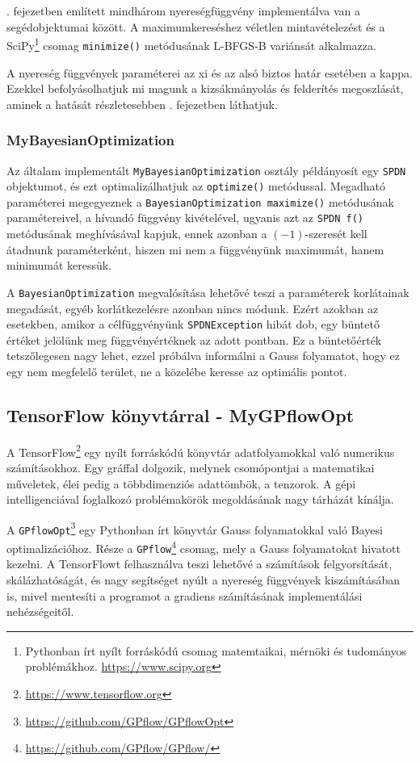 . fejezetben említett mindhárom nyereségfüggvény implementálva van a segédobjektumai között. A maximumkereséshez véletlen mintavételezést és a SciPy\footnote{Pythonban írt nyílt forráskódú csomag matemtaikai, mérnöki és tudományos problémákhoz. \mbox{\url{https://www.scipy.org}}} csomag \texttt{minimize()} metódusának L-BFGS-B variánsát alkalmazza.

A nyereség függvények paraméterei az xi és az alsó biztos határ esetében a kappa. Ezekkel befolyásolhatjuk mi magunk a kizsákmányolás és felderítés megoszlását, aminek a hatását részletesebben . fejezetben láthatjuk.

\subsubsection{MyBayesianOptimization}
Az általam implementált \texttt{MyBayesianOptimization} osztály példányosít egy \texttt{SPDN} objektumot, és ezt optimalizálhatjuk az \texttt{optimize()} metódussal. Megadható paraméterei megegyeznek a \texttt{BayesianOptimization maximize()} metódusának paramétereivel, a hívandó függvény kivételével, ugyanis azt az \texttt{SPDN f()} metódusának meghívásával kapjuk, ennek azonban a $(-1)$-szeresét kell átadnunk paraméterként, hiszen mi nem a függvényünk maximumát, hanem minimumát keressük.

A \texttt{BayesianOptimization} megvalósítása lehetővé teszi a paraméterek korlátainak megadását, egyéb korlátkezelésre azonban nincs módunk. Ezért azokban az esetekben, amikor a célfüggvényünk \texttt{SPDNException} hibát dob, egy büntető értéket jelölünk meg függvényértéknek az adott pontban. Ez a büntetőérték tetszőlegesen nagy lehet, ezzel próbálva informálni a Gauss folyamatot, hogy ez egy nem megfelelő terület, ne a közelébe keresse az optimális pontot.

\subsection{TensorFlow könyvtárral - MyGPflowOpt}
A TensorFlow\footnote{\url{https://www.tensorflow.org}} egy nyílt forráskódú könyvtár adatfolyamokkal való numerikus számításokhoz. Egy gráffal dolgozik, melynek csomópontjai a matematikai műveletek, élei pedig a többdimenziós adattömbök, a tenzorok. A gépi intelligenciával foglalkozó problémakörök megoldásának nagy tárházát kínálja.

A \texttt{GPflowOpt}\footnote{\url{https://github.com/GPflow/GPflowOpt}} egy Pythonban írt könyvtár Gauss folyamatokkal való Bayesi optimalizációhoz. Része a \texttt{GPflow}\footnote{\url{https://github.com/GPflow/GPflow/}} csomag, mely a Gauss folyamatokat hivatott kezelni. A TensorFlowt felhasználva teszi lehetővé a számítások felgyorsítását, skálázhatóságát, és nagy segítséget nyúlt a nyereség függvények kiszámításában is, mivel mentesíti a programot a gradiens számításának implementálási nehézségeitől.

